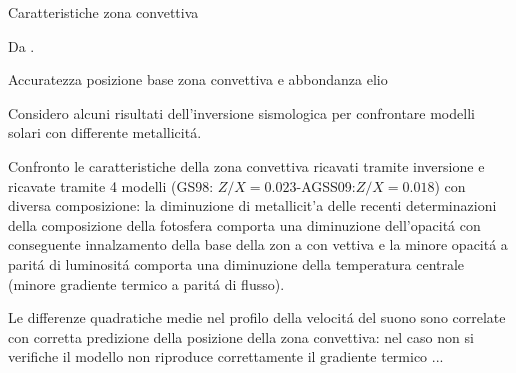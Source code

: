 \documentclass[10pt,xcolor={usenames},fleqn,mathserif,serif]{beamer}
\begin{document}
\begin{frame}{Caratteristiche zona convettiva}

\begin{table}[!ht]%

     \caption{Da \cite{basu2016global}.}
\label{tab:CZZvar}
\end{table}

\end{frame}

\begin{wordonframe}{Accuratezza posizione base zona convettiva e abbondanza elio}

Considero alcuni risultati dell'inversione sismologica per confrontare modelli solari con differente metallicit\'a.

Confronto le caratteristiche della zona convettiva ricavati tramite inversione e  ricavate tramite 4 modelli (GS98: $Z/X=0.023$-AGSS09:$Z/X=0.018$) con diversa composizione: la diminuzione di metallicit'a delle recenti determinazioni della composizione della fotosfera comporta una diminuzione dell'opacit\'a con conseguente innalzamento della base della zon a con vettiva e la minore opacit\'a a parit\'a di luminosit\'a comporta una diminuzione della temperatura centrale (minore gradiente termico a parit\'a di flusso).

Le differenze quadratiche medie nel profilo della velocit\'a del suono sono  correlate con corretta predizione della posizione della zona convettiva: nel caso non si verifiche il modello non riproduce correttamente il gradiente termico ...

\end{wordonframe}
\end{document}
